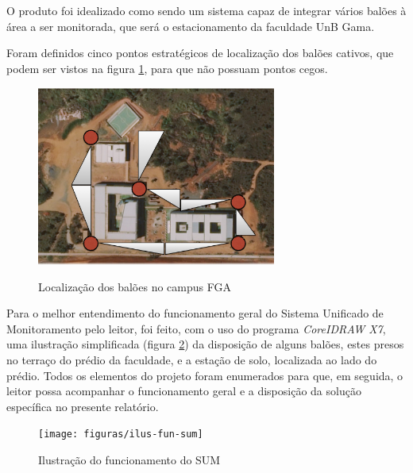 O produto foi idealizado como sendo um sistema capaz de integrar vários balões à área a ser monitorada, que será o estacionamento da faculdade UnB Gama.

Foram definidos cinco pontos estratégicos de localização dos balões cativos, que podem ser vistos na figura \ref{img:localizacao-baloes}, para que não possuam pontos cegos.


\begin{figure}[H]
	\centering
	\caption{Localização dos balões no campus FGA}
	\includegraphics[width=0.7\textwidth]{figuras/localizacao-baloes}
	\label{img:localizacao-baloes}
\end{figure}


Para o melhor entendimento do funcionamento geral do Sistema Unificado de Monitoramento pelo leitor, foi feito, com o uso do programa \emph{CoreIDRAW X7}, uma ilustração simplificada (figura \ref{img:ilus-fun-sum}) da disposição de alguns balões, estes presos no terraço do prédio da faculdade, e a estação de solo, localizada ao lado do prédio. Todos os elementos do projeto foram enumerados  para que, em seguida, o leitor possa acompanhar o funcionamento geral e a disposição da solução específica no presente relatório.

\begin{figure}[H]
\centering
\caption{Ilustração do funcionamento do SUM}
\texttt{[image: figuras/ilus-fun-sum]}
\label{img:ilus-fun-sum}
\end{figure}

